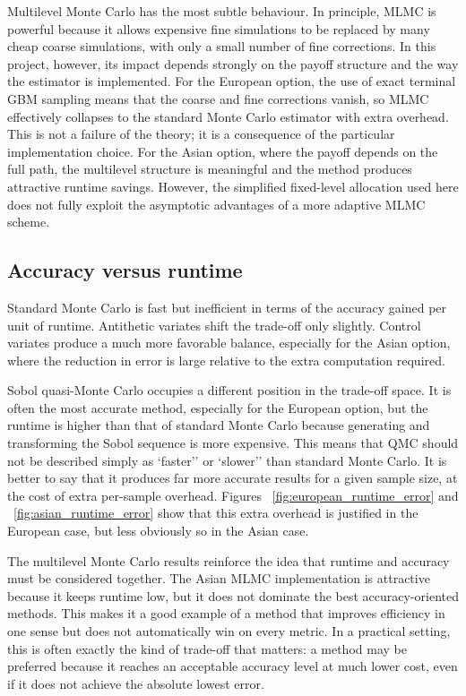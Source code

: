 \documentclass[11pt]{article}
\begin{document}
Multilevel Monte Carlo has the most subtle behaviour. In principle, MLMC is powerful because it allows expensive fine simulations to be replaced by many cheap coarse simulations, with only a small number of fine corrections. In this project, however, its impact depends strongly on the payoff structure and the way the estimator is implemented. For the European option, the use of exact terminal GBM sampling means that the coarse and fine corrections vanish, so MLMC effectively collapses to the standard Monte Carlo estimator with extra overhead. This is not a failure of the theory; it is a consequence of the particular implementation choice. For the Asian option, where the payoff depends on the full path, the multilevel structure is meaningful and the method produces attractive runtime savings. However, the simplified fixed-level allocation used here does not fully exploit the asymptotic advantages of a more adaptive MLMC scheme.


\subsection{Accuracy versus runtime}

Standard Monte Carlo is fast but inefficient in terms of the accuracy gained per unit of runtime. Antithetic variates shift the trade-off only slightly. Control variates produce a much more favorable balance, especially for the Asian option, where the reduction in error is large relative to the extra computation required.

Sobol quasi-Monte Carlo occupies a different position in the trade-off space. It is often the most accurate method, especially for the European option, but the runtime is higher than that of standard Monte Carlo because generating and transforming the Sobol sequence is more expensive. This means that QMC should not be described simply as `faster'' or `slower'' than standard Monte Carlo. It is better to say that it produces far more accurate results for a given sample size, at the cost of extra per-sample overhead. Figures ~\ref{fig:european_runtime_error} and ~\ref{fig:asian_runtime_error} show that this extra overhead is justified in the European case, but less obviously so in the Asian case.

The multilevel Monte Carlo results reinforce the idea that runtime and accuracy must be considered together. The Asian MLMC implementation is attractive because it keeps runtime low, but it does not dominate the best accuracy-oriented methods. This makes it a good example of a method that improves efficiency in one sense but does not automatically win on every metric. In a practical setting, this is often exactly the kind of trade-off that matters: a method may be preferred because it reaches an acceptable accuracy level at much lower cost, even if it does not achieve the absolute lowest error.
\end{document}
